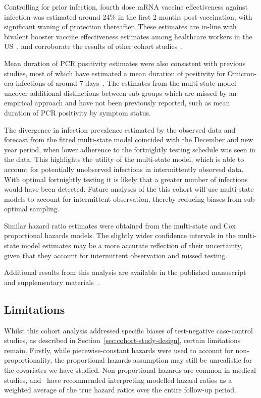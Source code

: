 Controlling for prior infection, fourth dose mRNA vaccine effectiveness against infection was estimated around 24\% in the first 2 months post-vaccination, with significant waning of protection thereafter. These estimates are in-line with bivalent booster vaccine effectiveness estimates among healthcare workers in the US~\parencite{Shrestha2023-oq}, and corroborate the results of other cohort studies~\parencite{Auvigne2023-ay, Huiberts2023-kq}.

Mean duration of PCR positivity estimates were also consistent with previous studies, most of which have estimated a mean duration of positivity for Omicron-era infections of around 7 days~\parencite{Hay2022-sg, UK_Health_Security_Agency2023-us, Boucau2022-it, Pei2023-qd, Kojima2022-vh}. The estimates from the multi-state model uncover additional distinctions between sub-groups which are missed by an empirical approach and have not been previously reported, such as mean duration of PCR positivity by symptom status.

The divergence in infection prevalence estimated by the observed data and forecast from the fitted multi-state model coincided with the December and new year period, when lower adherence to the fortnightly testing schedule was seen in the data. This highlights the utility of the multi-state model, which is able to account for potentially unobserved infections in intermittently observed data. With optimal fortnightly testing it is likely that a greater number of infections would have been detected. Future analyses of the this cohort will use multi-state models to account for intermittent observation, thereby reducing biases from sub-optimal sampling.

Similar hazard ratio estimates were obtained from the multi-state and Cox proportional hazards models. The slightly wider confidence intervals in the multi-state model estimates may be a more accurate reflection of their uncertainty, given that they account for intermittent observation and missed testing. 

Additional results from this analysis are available in the published manuscript and supplementary materials~\parencite{Kirwan2024-hj}.

\subsection{Limitations}\label{sec:siren-limitations}

Whilst this cohort analysis addressed specific biases of test-negative case-control studies, as described in Section~\ref{sec:cohort-study-design}, certain limitations remain. Firstly, while piecewise-constant hazards were used to account for non-proportionality, the proportional hazards assumption may still be unrealistic for the covariates we have studied. Non-proportional hazards are common in medical studies, and~\cite{Stensrud2020-wa} have recommended interpreting modelled hazard ratios as a weighted average of the true hazard ratios over the entire follow-up period.

